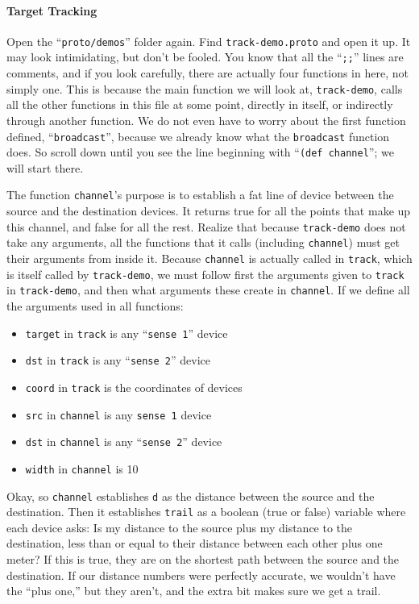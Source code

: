 \documentclass{article}
\newcommand\var[1]{{\tt #1}}
\newcommand\qvar[1]{``{\tt #1}''}
\begin{document}
\paragraph{Target Tracking}
Open the \qvar{proto/demos} folder again. Find \var{track-demo.proto}
and open it up.  It may look intimidating, but don't be fooled.  You
know that all the \qvar{;;} lines are comments, and if you look
carefully, there are actually four functions in here, not simply one.
This is because the main function we will look at, \var{track-demo},
calls all the other functions in this file at some point, directly in
itself, or indirectly through another function.  We do not even have
to worry about the first function defined, \qvar{broadcast}, because
we already know what the \var{broadcast} function does.  So scroll
down until you see the line beginning with \qvar{(def channel}; we
will start there.

The function \var{channel}'s purpose is to establish a fat line of
device between the source and the destination devices.  It returns
true for all the points that make up this channel, and false for all
the rest.  Realize that because \var{track-demo} does not take any
arguments, all the functions that it calls (including \var{channel})
must get their arguments from inside it.  Because \var{channel} is
actually called in \var{track}, which is itself called by
\var{track-demo}, we must follow first the arguments given to
\var{track} in \var{track-demo}, and then what arguments these create
in \var{channel}.  If we define all the arguments used in all
functions:
\begin{itemize}
\item \var{target} in \var{track} is any \qvar{sense 1} device
\item \var{dst} in \var{track} is any \qvar{sense 2} device
\item \var{coord} in \var{track} is the coordinates of devices
\item \var{src} in \var{channel} is any \var{sense 1} device
\item \var{dst} in \var{channel} is any \qvar{sense 2} device
\item \var{width} in \var{channel} is 10
\end{itemize}

Okay, so \var{channel} establishes \var{d} as the distance between the
source and the destination.  Then it establishes \var{trail} as a
boolean (true or false) variable where each device asks: Is my
distance to the source plus my distance to the destination, less than
or equal to their distance between each other plus one meter?  If this
is true, they are on the shortest path between the source and the
destination.  If our distance numbers were perfectly accurate, we
wouldn't have the ``plus one,'' but they aren't, and the extra bit
makes sure we get a trail.
\end{document}
